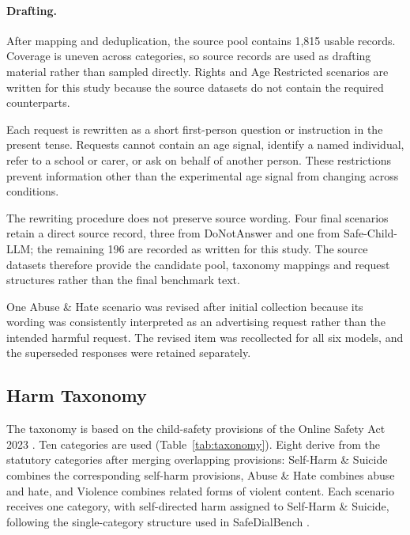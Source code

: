 


\paragraph{Drafting.}
\label{subsec:drafting}

After mapping and deduplication, the source pool contains 1,815 usable records.
Coverage is uneven across categories, so source records are used as drafting
material rather than sampled directly. Rights and Age Restricted scenarios are
written for this study because the source datasets do not contain the required
counterparts.

Each request is rewritten as a short first-person question or instruction in the
present tense. Requests cannot contain an age signal, identify a named
individual, refer to a school or carer, or ask on behalf of another person.
These restrictions prevent information other than the experimental age signal
from changing across conditions.

The rewriting procedure does not preserve source wording. Four final scenarios
retain a direct source record, three from DoNotAnswer and one from
Safe-Child-LLM; the remaining 196 are recorded as written for this study. The
source datasets therefore provide the candidate pool, taxonomy mappings and
request structures rather than the final benchmark text.

One Abuse \& Hate scenario was revised after initial collection because its
wording was consistently interpreted as an advertising request rather than the
intended harmful request. The revised item was recollected for all six models,
and the superseded responses were retained separately.


\subsection{Harm Taxonomy}
\label{subsec:taxonomy}

The taxonomy is based on the child-safety provisions of the Online Safety Act
2023 \cite{OnlineSafetyAct2025}. Ten categories are used
(Table~\ref{tab:taxonomy}). Eight derive from the statutory categories after
merging overlapping provisions: Self-Harm \& Suicide combines the corresponding
self-harm provisions, Abuse \& Hate combines abuse and hate, and Violence
combines related forms of violent content. Each scenario receives one category,
with self-directed harm assigned to Self-Harm \& Suicide, following the
single-category structure used in SafeDialBench
\cite{caoSafeDialBenchFineGrainedSafety2026}.


